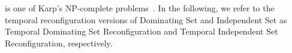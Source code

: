  is one of Karp's NP-complete problems~\cite{Karp1972}.
In the following, we refer to the temporal reconfiguration versions of {\sc Dominating Set} and {\sc Independent Set} as {\sc Temporal Dominating Set Reconfiguration} and {\sc Temporal Independent Set Reconfiguration}, respectively.




 
 
